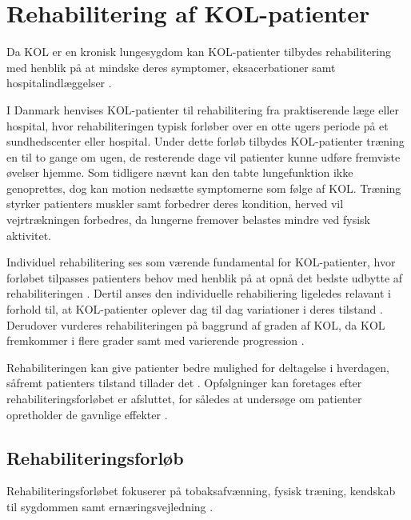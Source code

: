 \section{Rehabilitering af KOL-patienter} \label{sec:rehabilitering}
Da KOL er en kronisk lungesygdom kan KOL-patienter tilbydes rehabilitering med henblik på at mindske deres symptomer, eksacerbationer samt hospitalindlæggelser \cite{Hellem2012,Williams2014}. 

I Danmark henvises KOL-patienter til rehabilitering fra praktiserende læge eller hospital, hvor rehabiliteringen typisk forløber over en otte ugers periode på et sundhedscenter eller hospital. Under dette forløb tilbydes KOL-patienter træning en til to gange om ugen, de resterende dage vil patienter kunne udføre fremviste øvelser hjemme.\cite{McCarthy2015,Frausing2011b} Som tidligere nævnt kan den tabte lungefunktion ikke genoprettes, dog kan motion nedsætte symptomerne som følge af KOL. Træning styrker patienters muskler samt forbedrer deres kondition, herved vil vejrtrækningen forbedres, da lungerne fremover belastes mindre ved fysisk aktivitet.\cite{Lungeforeningen2016}

Individuel rehabilitering ses som værende fundamental for KOL-patienter, hvor forløbet tilpasses patienters behov med henblik på at opnå det bedste udbytte af rehabiliteringen \cite{McCarthy2015,Habraken2011,Sundhedsstyrelsen2015}. Dertil anses den individuelle rehabiliering ligeledes relavant i forhold til, at KOL-patienter oplever dag til dag variationer i deres tilstand \cite{Hellem2012}. Derudover vurderes rehabiliteringen på baggrund af graden af KOL, da KOL fremkommer i flere grader samt med varierende progression \cite{McCarthy2015}. 

Rehabiliteringen kan give patienter bedre mulighed for deltagelse i hverdagen, såfremt patienters tilstand tillader det \cite{McCarthy2015,Habraken2011, Sundhedsstyrelsen2015}. Opfølgninger kan foretages efter rehabiliteringsforløbet er afsluttet, for således at undersøge om patienter opretholder de gavnlige effekter \cite{Frausing2011b}.


\subsection{Rehabiliteringsforløb}
Rehabiliteringsforløbet fokuserer på tobaksafvænning, fysisk træning, kendskab til sygdommen samt ernæringsvejledning \cite{McCarthy2015,Habraken2011,Sundhedsstyrelsen2015}.


